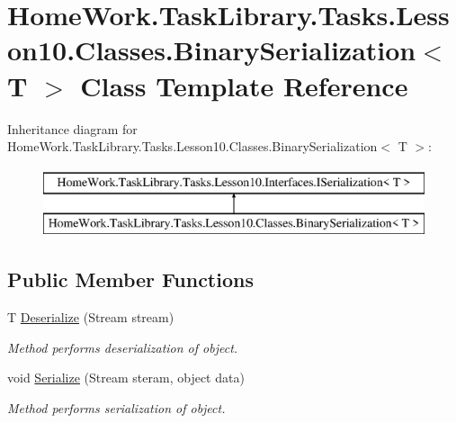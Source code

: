 \hypertarget{class_home_work_1_1_task_library_1_1_tasks_1_1_lesson10_1_1_classes_1_1_binary_serialization}{}\section{Home\+Work.\+Task\+Library.\+Tasks.\+Lesson10.\+Classes.\+Binary\+Serialization$<$ T $>$ Class Template Reference}
\label{class_home_work_1_1_task_library_1_1_tasks_1_1_lesson10_1_1_classes_1_1_binary_serialization}
Inheritance diagram for Home\+Work.\+Task\+Library.\+Tasks.\+Lesson10.\+Classes.\+Binary\+Serialization$<$ T $>$\+:\begin{figure}[H]
\begin{center}
\leavevmode
\includegraphics[height=2.000000cm]{class_home_work_1_1_task_library_1_1_tasks_1_1_lesson10_1_1_classes_1_1_binary_serialization}
\end{center}
\end{figure}
\subsection*{Public Member Functions}
\begin{DoxyCompactItemize}
\item 
T \mbox{\hyperlink{class_home_work_1_1_task_library_1_1_tasks_1_1_lesson10_1_1_classes_1_1_binary_serialization_a770ba2fcc058254d31cd3b91f79a74a3}{Deserialize}} (Stream stream)
\begin{DoxyCompactList}\small\item\em Method performs deserialization of object. \end{DoxyCompactList}\item 
void \mbox{\hyperlink{class_home_work_1_1_task_library_1_1_tasks_1_1_lesson10_1_1_classes_1_1_binary_serialization_aebd294d1c05f37a0b3781fbe65968d4c}{Serialize}} (Stream steram, object data)
\begin{DoxyCompactList}\small\item\em Method performs serialization of object. \end{DoxyCompactList}\end{DoxyCompactItemize}


